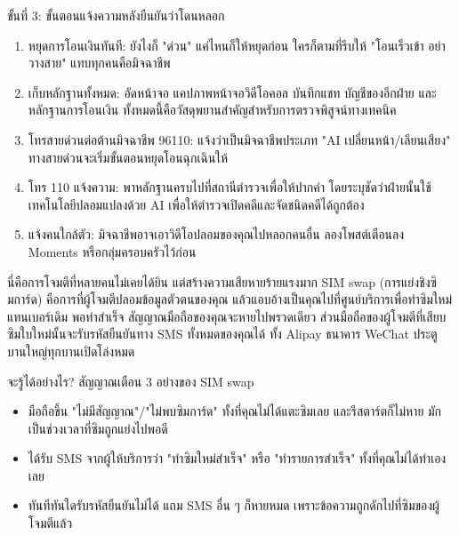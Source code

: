 \begin{tcbwarn}{ขั้นที่ 3: ขั้นตอนแจ้งความหลังยืนยันว่าโดนหลอก}
\begin{enumerate}
  \item หยุดการโอนเงินทันที: ยังไงก็ "ด่วน" แค่ไหนก็ให้หยุดก่อน ใครก็ตามที่รีบให้ "โอนเร็วเข้า อย่าวางสาย" แทบทุกคนคือมิจฉาชีพ
  \item เก็บหลักฐานทั้งหมด: อัดหน้าจอ แคปภาพหน้าจอวิดีโอคอล บันทึกแชท บัญชีของอีกฝ่าย และหลักฐานการโอนเงิน ทั้งหมดนี้คือวัสดุพยานสำคัญสำหรับการตรวจพิสูจน์ทางเทคนิค
  \item โทรสายด่วนต่อต้านมิจฉาชีพ 96110: แจ้งว่าเป็นมิจฉาชีพประเภท "AI เปลี่ยนหน้า/เลียนเสียง" ทางสายด่วนจะเริ่มขั้นตอนหยุดโอนฉุกเฉินให้
  \item โทร 110 แจ้งความ: พาหลักฐานครบไปที่สถานีตำรวจเพื่อให้ปากคำ โดยระบุชัดว่าฝ่ายนั้นใช้เทคโนโลยีปลอมแปลงด้วย AI เพื่อให้ตำรวจเปิดคดีและจัดชนิดคดีได้ถูกต้อง
  \item แจ้งคนใกล้ตัว: มิจฉาชีพอาจเอาวิดีโอปลอมของคุณไปหลอกคนอื่น ลองโพสต์เตือนลง Moments หรือกลุ่มครอบครัวไว้ก่อน
\end{enumerate}

\end{tcbwarn}


นี่คือการโจมตีที่หลายคนไม่เคยได้ยิน แต่สร้างความเสียหายร้ายแรงมาก SIM swap (การแย่งชิงซิมการ์ด) คือการที่ผู้โจมตีปลอมข้อมูลตัวตนของคุณ แล้วแอบอ้างเป็นคุณไปที่ศูนย์บริการเพื่อทำซิมใหม่แทนเบอร์เดิม พอทำสำเร็จ สัญญาณมือถือของคุณจะหายไปพรวดเดียว ส่วนมือถือของผู้โจมตีที่เสียบซิมใบใหม่นั้นจะรับรหัสยืนยันทาง SMS ทั้งหมดของคุณได้ ทั้ง Alipay ธนาคาร WeChat ประตูบานใหญ่ทุกบานเปิดโล่งหมด

\begin{tcbinfo}{จะรู้ได้อย่างไร? สัญญาณเตือน 3 อย่างของ SIM swap}
\begin{itemize}
  \item มือถือขึ้น "ไม่มีสัญญาณ"/"ไม่พบซิมการ์ด" ทั้งที่คุณไม่ได้แตะซิมเลย และรีสตาร์ตก็ไม่หาย มักเป็นช่วงเวลาที่ซิมถูกแย่งไปพอดี
  \item ได้รับ SMS จากผู้ให้บริการว่า "ทำซิมใหม่สำเร็จ" หรือ "ทำรายการสำเร็จ" ทั้งที่คุณไม่ได้ทำเองเลย
  \item ทันทีทันใดรับรหัสยืนยันไม่ได้ แถม SMS อื่น ๆ ก็หายหมด เพราะข้อความถูกดักไปที่ซิมของผู้โจมตีแล้ว
\end{itemize}

\end{tcbinfo}

